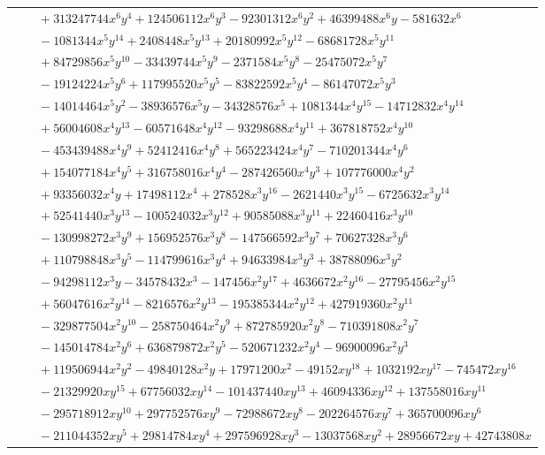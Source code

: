 \documentclass[11pt]{article}
\begin{document}
\begin{longtable}{@{}ll@{}}
 & $\quad +313247744x^{6}y^{4}+124506112x^{6}y^{3}-92301312x^{6}y^{2}+46399488x^{6}y-581632x^{6}$\\
 & $\quad -1081344x^{5}y^{14}+2408448x^{5}y^{13}+20180992x^{5}y^{12}-68681728x^{5}y^{11}$\\
 & $\quad +84729856x^{5}y^{10}-33439744x^{5}y^{9}-2371584x^{5}y^{8}-25475072x^{5}y^{7}$\\
 & $\quad -19124224x^{5}y^{6}+117995520x^{5}y^{5}-83822592x^{5}y^{4}-86147072x^{5}y^{3}$\\
 & $\quad -14014464x^{5}y^{2}-38936576x^{5}y-34328576x^{5}+1081344x^{4}y^{15}-14712832x^{4}y^{14}$\\
 & $\quad +56004608x^{4}y^{13}-60571648x^{4}y^{12}-93298688x^{4}y^{11}+367818752x^{4}y^{10}$\\
 & $\quad -453439488x^{4}y^{9}+52412416x^{4}y^{8}+565223424x^{4}y^{7}-710201344x^{4}y^{6}$\\
 & $\quad +154077184x^{4}y^{5}+316758016x^{4}y^{4}-287426560x^{4}y^{3}+107776000x^{4}y^{2}$\\
 & $\quad +93356032x^{4}y+17498112x^{4}+278528x^{3}y^{16}-2621440x^{3}y^{15}-6725632x^{3}y^{14}$\\
 & $\quad +52541440x^{3}y^{13}-100524032x^{3}y^{12}+90585088x^{3}y^{11}+22460416x^{3}y^{10}$\\
 & $\quad -130998272x^{3}y^{9}+156952576x^{3}y^{8}-147566592x^{3}y^{7}+70627328x^{3}y^{6}$\\
 & $\quad +110798848x^{3}y^{5}-114799616x^{3}y^{4}+94633984x^{3}y^{3}+38788096x^{3}y^{2}$\\
 & $\quad -94298112x^{3}y-34578432x^{3}-147456x^{2}y^{17}+4636672x^{2}y^{16}-27795456x^{2}y^{15}$\\
 & $\quad +56047616x^{2}y^{14}-8216576x^{2}y^{13}-195385344x^{2}y^{12}+427919360x^{2}y^{11}$\\
 & $\quad -329877504x^{2}y^{10}-258750464x^{2}y^{9}+872785920x^{2}y^{8}-710391808x^{2}y^{7}$\\
 & $\quad -145014784x^{2}y^{6}+636879872x^{2}y^{5}-520671232x^{2}y^{4}-96900096x^{2}y^{3}$\\
 & $\quad +119506944x^{2}y^{2}-49840128x^{2}y+17971200x^{2}-49152xy^{18}+1032192xy^{17}-745472xy^{16}$\\
 & $\quad -21329920xy^{15}+67756032xy^{14}-101437440xy^{13}+46094336xy^{12}+137558016xy^{11}$\\
 & $\quad -295718912xy^{10}+297752576xy^{9}-72988672xy^{8}-202264576xy^{7}+365700096xy^{6}$\\
 & $\quad -211044352xy^{5}+29814784xy^{4}+297596928xy^{3}-13037568xy^{2}+28956672xy+42743808x$\\

\end{longtable}
\end{document}
